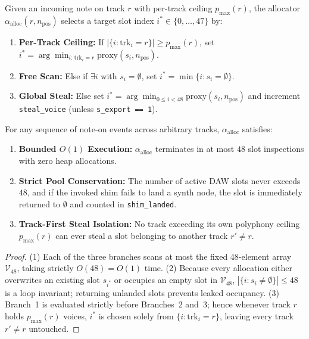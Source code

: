 \begin{definition}
Given an incoming note on track $r$ with per-track ceiling $p_{\max}(r)$, the allocator $\alpha_{\mathrm{alloc}}(r, n_{\mathrm{pos}})$ selects a target slot index $i^* \in \{0,\dots,47\}$ by:
\begin{enumerate}[leftmargin=1.5em]
  \item \textbf{Per-Track Ceiling:} If $|\{i : \mathrm{trk}_i = r\}| \ge p_{\max}(r)$, set $i^* = \arg\min_{i:\,\mathrm{trk}_i = r} \mathrm{proxy}(s_i, n_{\mathrm{pos}})$.
  \item \textbf{Free Scan:} Else if $\exists i$ with $s_i = \emptyset$, set $i^* = \min\{i : s_i = \emptyset\}$.
  \item \textbf{Global Steal:} Else set $i^* = \arg\min_{0 \le i < 48} \mathrm{proxy}(s_i, n_{\mathrm{pos}})$ and increment \texttt{steal\_voice} (unless \texttt{s\_export == 1}).
\end{enumerate}
\end{definition}

\begin{theorem}
\label{thm:voice-alloc}
For any sequence of note-on events across arbitrary tracks, $\alpha_{\mathrm{alloc}}$ satisfies:
\begin{enumerate}[leftmargin=1.5em]
  \item \textbf{Bounded $O(1)$ Execution:} $\alpha_{\mathrm{alloc}}$ terminates in at most $48$ slot inspections with zero heap allocations.
  \item \textbf{Strict Pool Conservation:} The number of active DAW slots never exceeds $48$, and if the invoked shim fails to land a synth node, the slot is immediately returned to $\emptyset$ and counted in \texttt{shim\_landed}.
  \item \textbf{Track-First Steal Isolation:} No track exceeding its own polyphony ceiling $p_{\max}(r)$ can ever steal a slot belonging to another track $r' \ne r$.
\end{enumerate}
\end{theorem}

\begin{proof}
(1) Each of the three branches scans at most the fixed 48-element array $\mathcal{V}_{48}$, taking strictly $O(48) = O(1)$ time.
(2) Because every allocation either overwrites an existing slot $s_{i^*}$ or occupies an empty slot in $\mathcal{V}_{48}$, $|\{i : s_i \ne \emptyset\}| \le 48$ is a loop invariant; returning unlanded slots prevents leaked occupancy.
(3) Branch~1 is evaluated strictly before Branches~2 and~3; hence whenever track $r$ holds $p_{\max}(r)$ voices, $i^*$ is chosen solely from $\{i : \mathrm{trk}_i = r\}$, leaving every track $r' \ne r$ untouched.
\end{proof}

